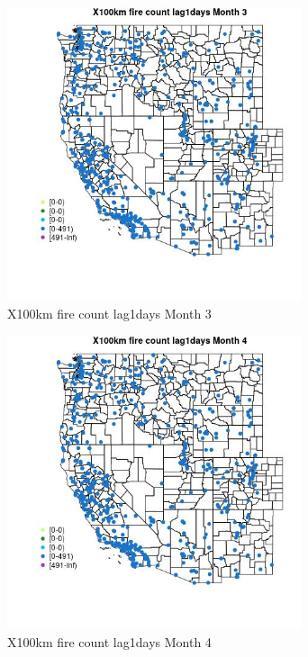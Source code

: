 \begin{figure} 
\centering  
\includegraphics[width=0.77\textwidth]{Code_Outputs/Report_ML_input_PM25_Step4_part_e_de_duplicated_aves_compiled_2019-05-14wNAs_MapObsMo3X100km_fire_count_lag1days.jpg} 
\caption{\label{fig:Report_ML_input_PM25_Step4_part_e_de_duplicated_aves_compiled_2019-05-14wNAsMapObsMo3X100km_fire_count_lag1days}X100km fire count lag1days Month 3} 
\end{figure} 
 

\clearpage 

\begin{figure} 
\centering  
\includegraphics[width=0.77\textwidth]{Code_Outputs/Report_ML_input_PM25_Step4_part_e_de_duplicated_aves_compiled_2019-05-14wNAs_MapObsMo4X100km_fire_count_lag1days.jpg} 
\caption{\label{fig:Report_ML_input_PM25_Step4_part_e_de_duplicated_aves_compiled_2019-05-14wNAsMapObsMo4X100km_fire_count_lag1days}X100km fire count lag1days Month 4} 
\end{figure} 
 

